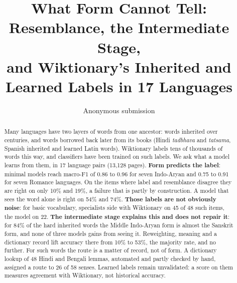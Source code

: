 \documentclass[11pt]{article}
\title{What Form Cannot Tell: Resemblance, the Intermediate Stage,\\and Wiktionary's Inherited and Learned Labels in 17 Languages}
\author{Anonymous submission}
\begin{document}
\maketitle

\begin{abstract}
Many languages have two layers of words from one ancestor: words inherited over centuries, and words borrowed back later from its books (Hindi \textit{tadbhava} and \textit{tatsama}, Spanish inherited and learned Latin words). Wiktionary labels tens of thousands of words this way, and classifiers have been trained on such labels. We ask what a model learns from them, in 17 language pairs (13,128 pages). \textbf{Form predicts the label}: minimal models reach macro-F1 of 0.86 to 0.96 for seven Indo-Aryan and 0.75 to 0.91 for seven Romance languages. On the items where label and resemblance disagree they are right on only 10\% and 19\%, a failure that is partly by construction. A model that sees the word alone is right on 54\% and 74\%. \textbf{Those labels are not obviously noise}: for basic vocabulary, specialists side with Wiktionary on 45 of 48 such items, the model on 22. \textbf{The intermediate stage explains this and does not repair it}: for 84\% of the hard inherited words the Middle Indo-Aryan form is almost the Sanskrit form, and none of three models gains from seeing it. Reweighting, meaning and a dictionary record lift accuracy there from 10\% to 53\%, the majority rate, and no further. For such words the route is a matter of record, not of form. A dictionary lookup of 48 Hindi and Bengali lemmas, automated and partly checked by hand, assigned a route to 26 of 58 senses. Learned labels remain unvalidated: a score on them measures agreement with Wiktionary, not historical accuracy.
\end{abstract}
\end{document}
